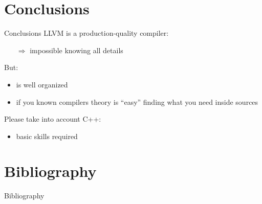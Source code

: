 \documentclass[10pt,mathserif]{beamer}
\begin{document}
\section{Conclusions}
\begin{frame}{Conclusions}
LLVM is a \alert{production-quality} compiler:

\begin{itemize}
\item[$\Rightarrow$] impossible knowing all details
\end{itemize}

But:

\begin{itemize}
\item is well organized
\item if you known compilers theory is ``easy'' finding what you need inside sources
\end{itemize}

Please take into account C++:
\begin{itemize}
\item basic skills required
\end{itemize}
\end{frame}

\section{Bibliography}
\begin{frame}[allowframebreaks]{Bibliography}
\nocite{*}


\end{frame}
\end{document}
